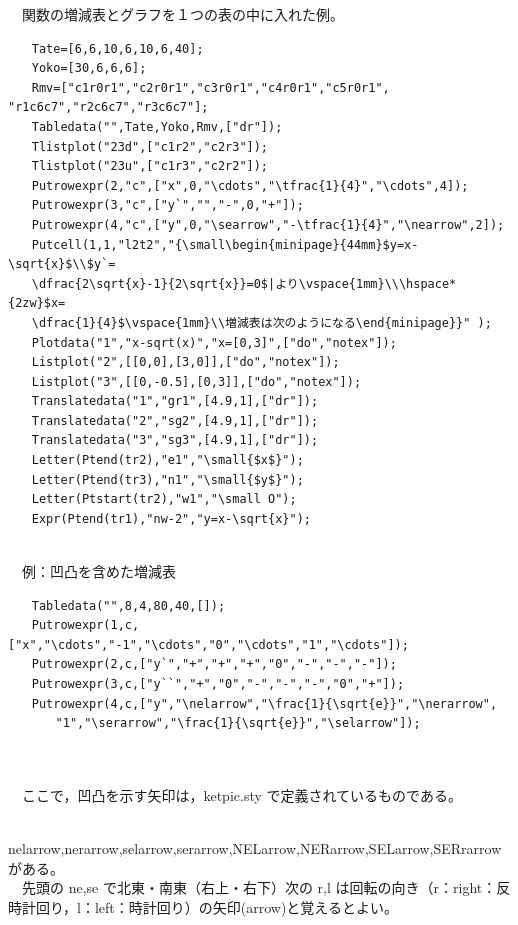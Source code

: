 \documentclass[papersize,a4paper,12pt,uplatex]{jsarticle}
\begin{document}
\begin{description}
　関数の増減表とグラフを１つの表の中に入れた例。
\begin{verbatim}
　　Tate=[6,6,10,6,10,6,40];
　　Yoko=[30,6,6,6];
　　Rmv=["c1r0r1","c2r0r1","c3r0r1","c4r0r1","c5r0r1", "r1c6c7","r2c6c7","r3c6c7"];
　　Tabledata("",Tate,Yoko,Rmv,["dr"]);
　　Tlistplot("23d",["c1r2","c2r3"]);
　　Tlistplot("23u",["c1r3","c2r2"]);
　　Putrowexpr(2,"c",["x",0,"\cdots","\tfrac{1}{4}","\cdots",4]);
　　Putrowexpr(3,"c",["y`","","-",0,"+"]);
　　Putrowexpr(4,"c",["y",0,"\searrow","-\tfrac{1}{4}","\nearrow",2]);
　　Putcell(1,1,"l2t2","{\small\begin{minipage}{44mm}$y=x-\sqrt{x}$\\$y`=
　　\dfrac{2\sqrt{x}-1}{2\sqrt{x}}=0$|より\vspace{1mm}\\\hspace*{2zw}$x=
　　\dfrac{1}{4}$\vspace{1mm}\\増減表は次のようになる\end{minipage}}" );
　　Plotdata("1","x-sqrt(x)","x=[0,3]",["do","notex"]);
　　Listplot("2",[[0,0],[3,0]],["do","notex"]);
　　Listplot("3",[[0,-0.5],[0,3]],["do","notex"]);
　　Translatedata("1","gr1",[4.9,1],["dr"]);
　　Translatedata("2","sg2",[4.9,1],["dr"]);
　　Translatedata("3","sg3",[4.9,1],["dr"]);
　　Letter(Ptend(tr2),"e1","\small{$x$}");
　　Letter(Ptend(tr3),"n1","\small{$y$}");
　　Letter(Ptstart(tr2),"w1","\small O");
　　Expr(Ptend(tr1),"nw-2","y=x-\sqrt{x}");
\end{verbatim}
　　　　　　　
　\\

　例：凹凸を含めた増減表
\begin{verbatim}
　　Tabledata("",8,4,80,40,[]);
　　Putrowexpr(1,c,["x","\cdots","-1","\cdots","0","\cdots","1","\cdots"]);
　　Putrowexpr(2,c,["y`","+","+","+","0","-","-","-"]);
　　Putrowexpr(3,c,["y``","+","0","-","-","-","0","+"]);
　　Putrowexpr(4,c,["y","\nelarrow","\frac{1}{\sqrt{e}}","\nerarrow",
　　　　"1","\serarrow","\frac{1}{\sqrt{e}}","\selarrow"]);
\end{verbatim}
　　　\\
　\\
　ここで，凹凸を示す矢印は，ketpic.sty で定義されているものである。

　　nelarrow,nerarrow,selarrow,serarrow,NELarrow,NERarrow,SELarrow,SERrarrow がある。\\

　先頭の ne,se で北東・南東（右上・右下）次の r,l は回転の向き（r：right：反時計回り，l：left：時計回り）の矢印(arrow)と覚えるとよい。


\end{description}
\end{document}
